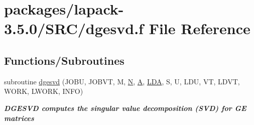 \hypertarget{dgesvd_8f}{}\section{packages/lapack-\/3.5.0/\+S\+R\+C/dgesvd.f File Reference}
\label{dgesvd_8f}
\subsection*{Functions/\+Subroutines}
\begin{DoxyCompactItemize}
\item 
subroutine \hyperlink{group__doubleGEsing_ga84fdf22a62b12ff364621e4713ce02f2}{dgesvd} (J\+O\+B\+U, J\+O\+B\+V\+T, M, \hyperlink{polmisc_8c_a0240ac851181b84ac374872dc5434ee4}{N}, \hyperlink{classA}{A}, \hyperlink{example__user_8c_ae946da542ce0db94dced19b2ecefd1aa}{L\+D\+A}, S, U, L\+D\+U, V\+T, L\+D\+V\+T, W\+O\+R\+K, L\+W\+O\+R\+K, I\+N\+F\+O)
\begin{DoxyCompactList}\small\item\em {\bfseries  D\+G\+E\+S\+V\+D computes the singular value decomposition (S\+V\+D) for G\+E matrices} \end{DoxyCompactList}\end{DoxyCompactItemize}
